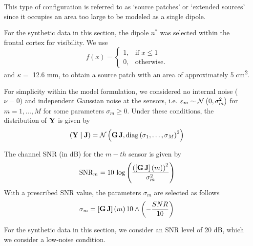 This type of configuration is referred to as `source patches' or `extended sources' since it occupies an area too large to be modeled as a single dipole.

For the synthetic data in this section, the dipole $n^*$ was selected within the frontal cortex for visibility.
%
We use 
\begin{equation}
f(x) = \begin{cases}
1, &\text{if } x\leq 1 \\
0, &\text{otherwise}.
\end{cases}
\end{equation}
and $\kappa = $ 12.6 \si{mm}, to obtain a source patch with an area of approximately 5 \si{cm^2}.

For simplicity within the model formulation, we considered no internal noise ($\nu=0$) and independent Gaussian noise at the sensors, i.e. $\varepsilon_m \sim\mathcal{N}\left( 0, \sigma_m^2 \right)$ for $m = 1, \dots, M$ for some parameters $\sigma_m\geq 0$.
%
Under these conditions, the distribution of $\mathbf{Y}$ is given by
\begin{equation}
\left( \mathbf{Y} \;\middle|\; \mathbf{J} \right) =
\mathcal{N}\left(  \mathbf{G}\, \mathbf{J}, \text{diag}\left(  \sigma_1, \dots, \sigma_M  \right)^2  \right)
\end{equation}

The channel SNR (in dB) for the $m-th$ sensor is given by
\begin{equation}
\text{SNR}_m = 
10\, \log\left(  \frac{ \left(  \left[ \mathbf{G}\, \mathbf{J} \right](m) \right)^2 }{\sigma_m^2}  \right)
\end{equation}
With a prescribed SNR value, the parameters $\sigma_m$ are selected as follows
\begin{equation}
\sigma_m = 
\left[ \mathbf{G}\, \mathbf{J} \right](m)\,
10\wedge \left( -\frac{SNR}{10} \right)
\end{equation}

For the synthetic data in this section, we consider an SNR level of 20 dB, which we consider a low-noise condition.



